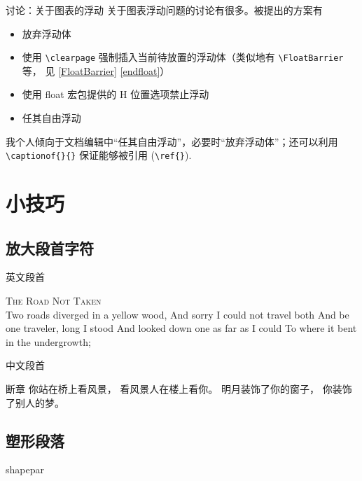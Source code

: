 \documentclass[]{ctexbeamer}
\begin{document}
\begin{frame}[fragile]{讨论：关于图表的浮动}
关于图表浮动问题的讨论有很多。被提出的方案有
\begin{itemize}
  \item 放弃浮动体
  \item 使用 \verb+\clearpage+ 强制插入当前待放置的浮动体（类似地有 \verb+\FloatBarrier+ 等， 见 \ref{FloatBarrier} \ref{endfloat}）
  \item 使用 float 宏包提供的 H 位置选项禁止浮动
  \item 任其自由浮动
\end{itemize}
我个人倾向于文档编辑中“任其自由浮动”，必要时“放弃浮动体”；还可以利用 \verb+\captionof{}{}+ 保证能够被引用 (\verb+\ref{}+).
\end{frame}


\section{小技巧}
\subsection{放大段首字符}
% 
\begin{frame}[fragile]{英文段首}
\begin{vertlst}
  
  \lettrine[lines=3]{T}{he Road Not Taken} \\
  Two roads diverged in a yellow wood,
  And sorry I could not travel both
  And be one traveler, long I stood
  And looked down one as far as I could
  To where it bent in the undergrowth;
\end{vertlst}
\end{frame}


\begin{frame}[fragile]{中文段首}
\begin{vertlst}
  \lettrine{断}{章}
  你站在桥上看风景，
  看风景人在楼上看你。
  明月装饰了你的窗子，
  你装饰了别人的梦。
  \end{vertlst}
\end{frame}



\subsection{塑形段落}
% 
\begin{frame}[fragile]{shapepar}
\begin{vertlst}
\small
\nutpar{\zhlipsum[2-3][name=nanshanjing]}
\end{vertlst}
\end{frame}
\end{document}
